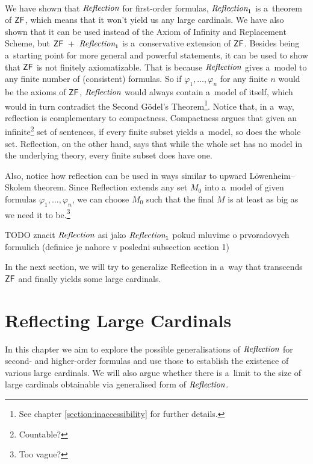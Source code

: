 \documentclass[12pt,a4paper]{article}
\begin{document}
\

We have shown that $\emph{Reflection}$ for first-order formulas, $\emph{Reflection}_1$ is a~theorem of $\sf{ZF}$, which means that it won't yield us any large cardinals. We have also shown that it can be used instead of the Axiom of Infinity and Replacement Scheme, but $\sf{ZF}\ +\ \emph{Reflection}_1$ is a~conservative extension of $\sf{ZF}$. Besides being a~starting point for more general and powerful statements, it can be used to show that $\sf{ZF}$ is not finitely axiomatizable. That is because $\emph{Reflection}$ gives a~model to any finite number of (consistent) formulas. So if $\varphi_1, \ldots, \varphi_n$ for any finite $n$ would be the axioms of $\sf{ZF}$, $\emph{Reflection}$ would always contain a~model of itself, which would in turn contradict the Second Gödel's Theorem\footnote{See chapter \ref{section:inaccessibility} for further details.}.
Notice that, in a~way, reflection is complementary to compactness. Compactness argues that given an infinite\footnote{Countable?} set of sentences, if every finite subset yields a~model, so does the whole set. Reflection, on the other hand, says that while the whole set has no model in the underlying theory, every finite subset does have one.

Also, notice how reflection can be used in ways similar to upward Löwenheim–Skolem theorem. Since Reflection extends any set $M_0$ into a~model of given formulas $\varphi_1, \ldots, \varphi_n$, we can choose $M_0$ such that the final $M$ is at least as big as we need it to be.\footnote{Too vague?}

TODO znacit $ \emph{Reflection} $ asi jako $\emph{Reflection}_1$ pokud mluvime o prvoradovych formulich (definice je nahore v posledni subsection section 1)

In the next section, we will try to generalize Reflection in a~way that transcends $\sf{ZF}$ and finally yields some large cardinals.

\newpage
\section{Reflecting Large Cardinals} %

In this chapter we aim to explore the possible generalisations of $\emph{Reflection}$ for second- and higher-order formulas and use those to establish the existence of various large cardinals. We will also argue whether there is a~limit to the size of large cardinals obtainable via generalised form of $\emph{Reflection}$. 
\end{document}
